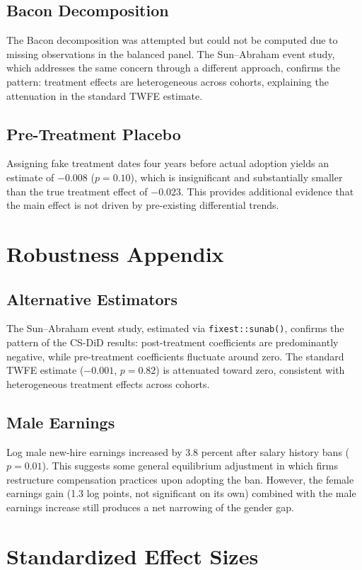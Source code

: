 \documentclass[12pt]{article}
\begin{document}
\subsection{Bacon Decomposition}

The Bacon decomposition \citep{GoodmanBacon2021} was attempted but could not be computed due to missing observations in the balanced panel. The Sun--Abraham event study, which addresses the same concern through a different approach, confirms the pattern: treatment effects are heterogeneous across cohorts, explaining the attenuation in the standard TWFE estimate.

\subsection{Pre-Treatment Placebo}

Assigning fake treatment dates four years before actual adoption yields an estimate of $-0.008$ ($p = 0.10$), which is insignificant and substantially smaller than the true treatment effect of $-0.023$. This provides additional evidence that the main effect is not driven by pre-existing differential trends.


\section{Robustness Appendix}

\subsection{Alternative Estimators}

The Sun--Abraham event study, estimated via \texttt{fixest::sunab()}, confirms the pattern of the CS-DiD results: post-treatment coefficients are predominantly negative, while pre-treatment coefficients fluctuate around zero. The standard TWFE estimate ($-0.001$, $p = 0.82$) is attenuated toward zero, consistent with heterogeneous treatment effects across cohorts.

\subsection{Male Earnings}

Log male new-hire earnings increased by 3.8 percent after salary history bans ($p = 0.01$). This suggests some general equilibrium adjustment in which firms restructure compensation practices upon adopting the ban. However, the female earnings gain (1.3 log points, not significant on its own) combined with the male earnings increase still produces a net narrowing of the gender gap.


\section{Standardized Effect Sizes}
\label{sec:sde}


\end{document}
